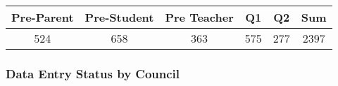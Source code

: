 \documentclass[]{article}
\begin{document}
\begin{longtable}[]{@{}cccccc@{}}
\toprule
\begin{minipage}[b]{0.15\columnwidth}\centering\strut
Pre-Parent\strut
\end{minipage} & \begin{minipage}[b]{0.16\columnwidth}\centering\strut
Pre-Student\strut
\end{minipage} & \begin{minipage}[b]{0.16\columnwidth}\centering\strut
Pre Teacher\strut
\end{minipage} & \begin{minipage}[b]{0.06\columnwidth}\centering\strut
Q1\strut
\end{minipage} & \begin{minipage}[b]{0.06\columnwidth}\centering\strut
Q2\strut
\end{minipage} & \begin{minipage}[b]{0.06\columnwidth}\centering\strut
Sum\strut
\end{minipage}\tabularnewline
\midrule
\endhead
\begin{minipage}[t]{0.15\columnwidth}\centering\strut
524\strut
\end{minipage} & \begin{minipage}[t]{0.16\columnwidth}\centering\strut
658\strut
\end{minipage} & \begin{minipage}[t]{0.16\columnwidth}\centering\strut
363\strut
\end{minipage} & \begin{minipage}[t]{0.06\columnwidth}\centering\strut
575\strut
\end{minipage} & \begin{minipage}[t]{0.06\columnwidth}\centering\strut
277\strut
\end{minipage} & \begin{minipage}[t]{0.06\columnwidth}\centering\strut
2397\strut
\end{minipage}\tabularnewline
\bottomrule
\end{longtable}

\subsubsection{Data Entry Status by
Council}\label{data-entry-status-by-council}
\end{document}
